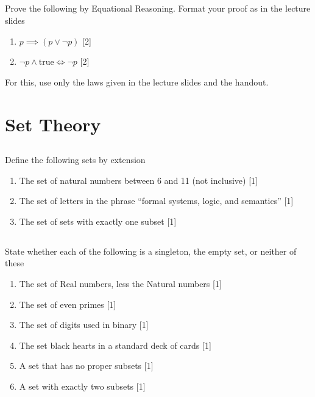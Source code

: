 \documentclass[twocolumn]{article}
\newcounter{pmarks}
\newcounter{marks}
\newcommand\mrk[1]{{\hfill\color{blue}\small[{#1}]}\addtocounter{pmarks}{#1}\addtocounter{marks}{#1}}
\begin{document}
\subsection{}

Prove the following by Equational Reasoning. Format your proof as in the lecture slides

\begin{enumerate}
    \item $p \implies (p \vee \neg p)$ \mrk{2}
    \item $\neg p \wedge \text{true} \Longleftrightarrow \neg p$ \mrk{2}
\end{enumerate}

For this, use only the laws given in the lecture slides and the handout.

\clearpage
\section{Set Theory}

\subsection{}

    Define the following sets by extension

    \begin{enumerate}
        \item The set of natural numbers between 6 and 11 (not inclusive) \mrk{1}
        \item The set of letters in the phrase ``formal systems, logic, and semantics'' \mrk{1}
        \item The set of sets with exactly one subset \mrk{1}
    \end{enumerate}

\subsection{}

    State whether each of the following is a singleton, the empty set, or neither of these

    \begin{enumerate}
        \item The set of Real numbers, less the Natural numbers \mrk{1}
        \item The set of even primes \mrk{1}
        \item The set of digits used in binary \mrk{1}
        \item The set black hearts in a standard deck of cards \mrk{1}
        \item A set that has no proper subsets \mrk{1}
        \item A set with exactly two subsets \mrk{1}
    \end{enumerate}
\end{document}
